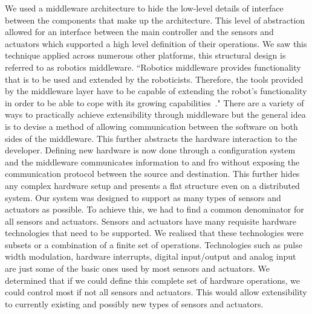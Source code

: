 We used a middleware architecture to hide the low-level details of interface between the components that make up the \xten architecture. This level of abstraction allowed for an interface between the main controller and the sensors and actuators which supported a high level definition of their operations. We saw this technique applied across numerous other platforms, this structural design is referred to as robotics middleware. ``Robotics middleware provides functionality that is to be used and extended by the roboticists. Therefore, the tools provided by the middleware layer have to be capable of extending the robot's functionality in order to be able to cope with its growing capabilities~\parencite{advanced}." There are a variety of ways to practically achieve extensibility through middleware but the general idea is to devise a method of allowing communication between the software on both sides of the middleware. This further abstracts the hardware interaction to the developer. Defining new hardware is now done through a configuration system and the middleware communicates information to and fro without exposing the communication protocol between the source and destination. This further hides any complex hardware setup and presents a flat structure even on a distributed system.
Our system was designed to support as many types of sensors and actuators as possible. To achieve this, we had to find a common denominator for all sensors and actuators. Sensors and actuators have many requisite hardware technologies that need to be supported. We realised that these technologies were subsets or a combination of a finite set of operations. Technologies such as pulse width modulation, hardware interrupts, digital input/output and analog input are just some of the basic ones used by most sensors and actuators. We determined that if we could define this complete set of hardware operations, we could control most if not all sensors and actuators. This would allow extensibility to currently existing and possibly new types of sensors and actuators.




